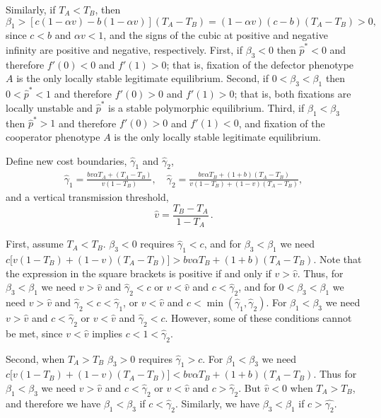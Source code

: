 \documentclass[12pt]{extarticle}
\begin{document}
{Similarly, if $T_A<T_B$, then
\begin{equation} \label{eq:beta1_rev}
   \beta_1 > [c(1-\alpha v) - b(1-\alpha v)] (T_A-T_B) 
   = (1-\alpha v)(c-b)(T_A-T_B) > 0,
 \end{equation}
since $c<b$ and $\alpha v < 1$, and the signs of the cubic at positive and negative infinity are positive and negative, respectively. 
First, if $\beta_3<0$ then $\hat{p}^*<0$ and therefore $f'(0)<0$ and $f'(1)>0$; that is, fixation of the defector phenotype $A$ is the only locally stable legitimate equilibrium.
Second, if $0<\beta_3<\beta_1$ then $0<\hat{p}^*<1$ and therefore $f'(0)>0$ and $f'(1)>0$; that is, both fixations are locally unstable and $\hat{p}^*$ is a stable polymorphic equilibrium.
Third, if $\beta_1<\beta_3$ then $\hat{p}^*>1$ and therefore $f'(0)>0$ and $f'(1)<0$, and fixation of the cooperator phenotype $A$ is the only locally stable legitimate equilibrium.

Define new cost boundaries, $\hat\gamma_1$ and $\hat\gamma_2$,
\begin{equation} \label{eq:cost_boundaries_v}
\begin{aligned}
\hat\gamma_1 = \frac{b v \alpha T_A + (T_A - T_B)}{v(1-T_B)}, \quad
\hat\gamma_2 = \frac{b v \alpha T_B + (1+b) (T_A - T_B)}{v(1-T_B) + (1-v)(T_A-T_B)},
\end{aligned}
\end{equation}
and  a vertical transmission threshold,
\begin{equation} \label{eq:v_threshold}
\hat v = \frac{T_B - T_A}{1-T_A} \,.
\end{equation}

First, assume $T_A<T_B$.
$\beta_3<0$ requires $\hat\gamma_1<c$,
and for $\beta_3<\beta_1$ we need $c\big[v(1-T_B) + (1-v)(T_A-T_B)\big] > bv\alpha T_B + (1+b)(T_A-T_B)$.
Note that the expression in the square brackets is positive if and only if $v > \hat v$.
Thus, for $\beta_3<\beta_1$ we need $v > \hat v$ and $\hat\gamma_2 < c$ or $v < \hat v$ and $c < \hat\gamma_2$,
and for $0<\beta_3<\beta_1$ we need $v > \hat v$ and $\hat\gamma_2 < c < \hat\gamma_1$, or $v < \hat v$ and $c < \min(\hat\gamma_1, \hat\gamma_2)$. For $\beta_1<\beta_3$ we need $v > \hat v$ and $c<\hat\gamma_2$ or $v < \hat v$ and $\hat\gamma_2<c$.
However, some of these conditions cannot be met, since $v < \hat v$ implies $c<1<\hat\gamma_2$.

Second, when $T_A>T_B$
$\beta_3>0$ requires $\hat\gamma_1 > c$. 
For $\beta_1<\beta_3$ we need $c\big[v(1-T_B) + (1-v)(T_A-T_B)\big] < bv\alpha T_B + (1+b)(T_A-T_B)$.
Thus for $\beta_1<\beta_3$ we need $v > \hat v$ and $c < \hat\gamma_2 $ or $v < \hat v$ and $c > \hat\gamma_2$.
But $\hat{v}<0$ when $T_A > T_B$, and therefore we have $\beta_1<\beta_3$ if $c < \hat\gamma_2$. Similarly, we have $\beta_3<\beta_1$ if $c > \hat{\gamma_2}$.

}
\end{document}
